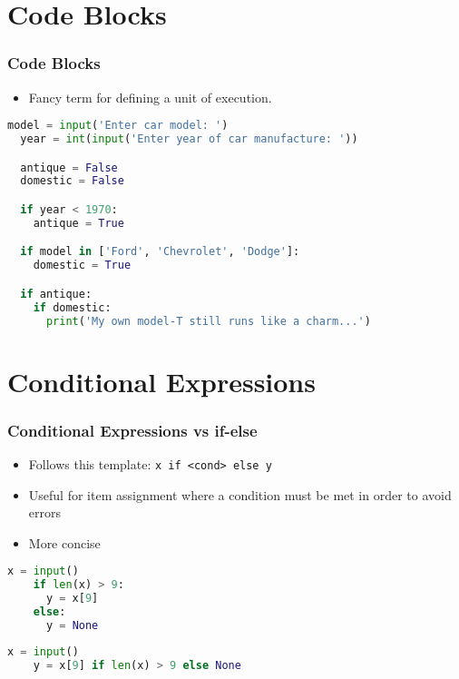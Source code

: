 \documentclass{beamer}
\begin{document}
\section{Code Blocks}
\begin{frame}[fragile]
  \frametitle{Code Blocks}

  \begin{itemize}
    \item Fancy term for defining a unit of execution.
  \end{itemize}
  \begin{lstlisting}[language=Python, autogobble]
  model = input('Enter car model: ')
  year = int(input('Enter year of car manufacture: '))

  antique = False
  domestic = False

  if year < 1970:
    antique = True

  if model in ['Ford', 'Chevrolet', 'Dodge']:
    domestic = True

  if antique:
    if domestic:
      print('My own model-T still runs like a charm...')
  \end{lstlisting}
\end{frame}

%
%
\section{Conditional Expressions}
\begin{frame}[fragile]
  \frametitle{Conditional Expressions vs if-else}

  \begin{itemize}
    \item Follows this template: \lstinline|x if <cond> else y|
    \item Useful for item assignment where a condition must be met in order to avoid errors
    \item More concise
  \end{itemize}
  \vfill
  \begin{minipage}{0.49\textwidth}
    \begin{lstlisting}[language=Python, autogobble]
    x = input()
    if len(x) > 9:
      y = x[9]
    else:
      y = None
    \end{lstlisting}
  \end{minipage}
  \begin{minipage}{0.49\textwidth}
    \begin{lstlisting}[language=Python, autogobble]
    x = input()
    y = x[9] if len(x) > 9 else None
    \end{lstlisting}
  \end{minipage}
\end{frame}
\end{document}
